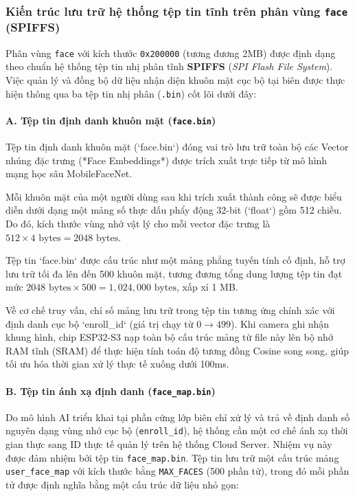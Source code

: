 \subsubsection{Kiến trúc lưu trữ hệ thống tệp tin tĩnh trên phân vùng \texttt{face} (SPIFFS)}

Phân vùng \texttt{face} với kích thước \texttt{0x200000} (tương đương 2MB) được định dạng theo chuẩn hệ thống tệp tin nhị phân tĩnh \textbf{SPIFFS} (\textit{SPI Flash File System}). Việc quản lý và đồng bộ dữ liệu nhận diện khuôn mặt cục bộ tại biên được thực hiện thông qua ba tệp tin nhị phân (\texttt{.bin}) cốt lõi dưới đây:

\paragraph{A. Tệp tin định danh khuôn mặt (\texttt{face.bin})}
Tệp tin định danh khuôn mặt (`face.bin`) đóng vai trò lưu trữ toàn bộ các Vector nhúng đặc trưng (*Face Embeddings*) được trích xuất trực tiếp từ mô hình mạng học sâu MobileFaceNet.

Mỗi khuôn mặt của một người dùng sau khi trích xuất thành công sẽ được biểu diễn dưới dạng một mảng số thực dấu phẩy động 32-bit (`float`) gồm 512 chiều. Do đó, kích thước vùng nhớ vật lý cho mỗi vector đặc trưng là $512 \times 4 \text{ bytes} = 2048 \text{ bytes}$.

Tệp tin `face.bin` được cấu trúc như một mảng phẳng tuyến tính cố định, hỗ trợ lưu trữ tối đa lên đến 500 khuôn mặt, tương đương tổng dung lượng tệp tin đạt mức $2048 \text{ bytes} \times 500 = 1,024,000 \text{ bytes}$, xấp xỉ 1 MB.

Về cơ chế truy vấn, chỉ số mảng lưu trữ trong tệp tin tương ứng chính xác với định danh cục bộ `enroll_id` (giá trị chạy từ $0 \rightarrow 499$). Khi camera ghi nhận khung hình, chip ESP32-S3 nạp toàn bộ cấu trúc mảng từ file này lên bộ nhớ RAM tĩnh (SRAM) để thực hiện tính toán độ tương đồng Cosine song song, giúp tối ưu hóa thời gian xử lý thực tế xuống dưới 100ms.

\paragraph{B. Tệp tin ánh xạ định danh (\texttt{face\_map.bin})}
Do mô hình AI triển khai tại phần cứng lớp biên chỉ xử lý và trả về định danh số nguyên dạng vùng nhớ cục bộ (\texttt{enroll\_id}), hệ thống cần một cơ chế ánh xạ thời gian thực sang ID thực tế quản lý trên hệ thống Cloud Server. Nhiệm vụ này được đảm nhiệm bởi tệp tin \texttt{face\_map.bin}. Tệp tin lưu trữ một cấu trúc mảng \texttt{user\_face\_map} với kích thước bằng \texttt{MAX\_FACES} (500 phần tử), trong đó mỗi phần tử được định nghĩa bằng một cấu trúc dữ liệu nhỏ gọn:

